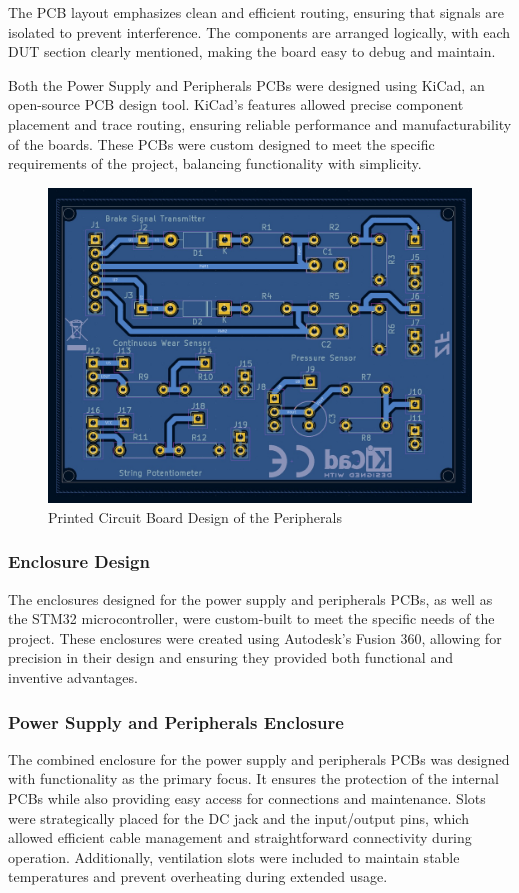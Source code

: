 \documentclass[12pt]{article}
\begin{document}
The PCB layout emphasizes clean and efficient routing, ensuring that signals
are isolated to prevent interference. The components are arranged logically,
with each DUT section clearly mentioned, making the board easy to debug and
maintain.

Both the Power Supply and Peripherals PCBs were designed using KiCad, an
open-source PCB design tool. KiCad's features allowed precise component
placement and trace routing, ensuring reliable performance and
manufacturability of the boards. These PCBs were custom designed to meet the
specific requirements of the project, balancing functionality with simplicity.

\begin{figure}[H]
  \includegraphics[width=\textwidth]{../assets/pcb/image7.jpg}
  \caption{Printed Circuit Board Design of the Peripherals}
\end{figure}
\subsubsection{Enclosure Design} 
The enclosures designed for the power supply
and peripherals PCBs, as well as the STM32 microcontroller, were custom-built
to meet the specific needs of the project. These enclosures were created using
Autodesk’s Fusion 360, allowing for precision in their design and ensuring they
provided both functional and inventive advantages.

\subsubsection*{Power Supply and Peripherals Enclosure} 
The combined enclosure
for the power supply and peripherals PCBs was designed with functionality as
the primary focus. It ensures the protection of the internal PCBs while also
providing easy access for connections and maintenance. Slots were strategically
placed for the DC jack and the input/output pins, which allowed efficient cable
management and straightforward connectivity during operation. Additionally,
ventilation slots were included to maintain stable temperatures and prevent
overheating during extended usage.
\end{document}
